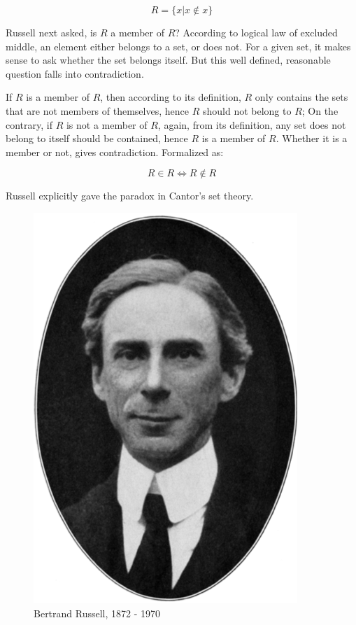 \documentclass{article}
\begin{document}
\[
R = \{ x | x \notin x \}
\]

Russell next asked, is $R$ a member of $R$? According to logical law of excluded middle, an element either belongs to a set, or does not. For a given set, it makes sense to ask whether the set belongs itself. But this well defined, reasonable question falls into contradiction.

If $R$ is a member of $R$, then according to its definition, $R$ only contains the sets that are not members of themselves, hence $R$ should not belong to $R$; On the contrary, if $R$ is not a member of $R$, again, from its definition, any set does not belong to itself should be contained, hence $R$ is a member of $R$. Whether it is a member or not, gives contradiction. Formalized as:

\[
R \in R \iff R \notin R
\]

Russell explicitly gave the paradox in Cantor's set theory.

\vspace{5mm}

\begin{figure}
 \centering
 \includegraphics[scale=0.5]{img/Russell.png}
 \captionsetup{labelformat=empty}
 \caption{Bertrand Russell, 1872 - 1970}
 \label{fig:Russell}
\end{figure}
\end{document}

